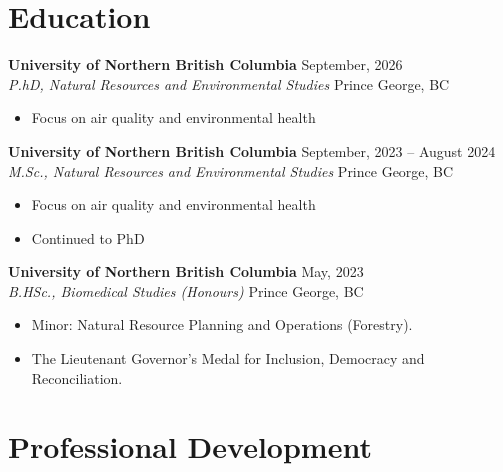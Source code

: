 \documentclass[11pt]{article}
\begin{document}
\section{Education}

\vspace{4pt}

\noindent\textbf{University of Northern British Columbia} \hfill September, 2026 \\
\textit{P.hD, Natural Resources and Environmental Studies} \hfill Prince George, BC
\begin{itemize}[leftmargin=*, topsep=2pt, itemsep=1pt, parsep=0pt]
\item Focus on air quality and environmental health
\end{itemize}

\vspace{8pt}

\noindent\textbf{University of Northern British Columbia} \hfill September, 2023 – August 2024 \\
\textit{M.Sc., Natural Resources and Environmental Studies} \hfill Prince George, BC
\begin{itemize}[leftmargin=*, topsep=2pt, itemsep=1pt, parsep=0pt]
\item Focus on air quality and environmental health
\item Continued to PhD
\end{itemize}

\vspace{8pt}

\noindent\textbf{University of Northern British Columbia} \hfill May, 2023 \\
\textit{B.HSc., Biomedical Studies (Honours)} \hfill Prince George, BC
\begin{itemize}[leftmargin=*, topsep=2pt, itemsep=1pt, parsep=0pt]
\item Minor: Natural Resource Planning and Operations (Forestry).
\item The Lieutenant Governor's Medal for Inclusion, Democracy and Reconciliation.
\end{itemize}

\section{Professional Development}

\vspace{4pt}
\end{document}
